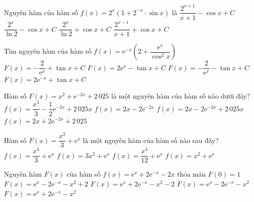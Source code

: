 \begin{ex}%
	 Nguyên hàm của hàm số $f(x)=2^x(1+2^{-x} \cdot \sin x)$ là
	\choice 
		{$\dfrac{2^{x+1}}{x+1}-\cos x+C$} 
		{\True $\dfrac{2^x}{\ln 2}-\cos x+C$} 
		 {$\dfrac{2^x}{\ln 2}+\cos x+C$}
		{$\dfrac{2^{x-1}}{x+1}+\cos  x+C$}
\end{ex}

\begin{ex}%
	Tìm nguyên hàm  của hàm số $f(x)=\mathrm{e}^{-x}\left(2+\dfrac{\mathrm{e}^x}{\cos^2 x}\right)$
	 \choice
		{\True $F(x)=-\dfrac{2}{\mathrm{e}^x}+\tan x+C$} 
		{$F(x)=2\mathrm{e}^x-\tan x+C$} 
		{$F(x)=-\dfrac{2}{\mathrm{e}^x}-\tan x+C$} 
		 {$F(x)=2\mathrm{e}^{-x}+\tan x+C$}
\end{ex}

\begin{ex}%
	Hàm số $F(x)=x^2+\mathrm{e}^{-2x}+2\,025$ là một nguyên hàm của hàm số nào  dưới đây?
	\choice 
		{$f(x)=\dfrac{x^3}{3}-\dfrac{1}{2}\mathrm{e}^{-2x}+2\,025x$} 
		{\True $f(x)=2x-2\mathrm{e}^{-2x}$} 
		 {$f(x)=2x-2\mathrm{e}^{-2x}+2\,025x$}
		{$f(x)=2x+2\mathrm{e}^{-2x}+2\,025$} 
\end{ex}

\begin{ex}%
	 Hàm số $F(x)=\dfrac{x^3}{3}+\mathrm{e}^x$ là một nguyên hàm của hàm số nào sau đây?
	\choice 
		{$f(x)=\dfrac{x^4}{3}+\mathrm{e}^x$} 
		{$f(x)=3x^2+\mathrm{e}^x$} 
		 {$f(x)=\dfrac{x^4}{12}+\mathrm{e}^x$}
		{\True  $f(x)=x^2+\mathrm{e}^x$}
\end{ex}

\begin{ex}%
	Nguyên hàm $F(x)$ của  hàm số $f(x)=\mathrm{e}^x+2\mathrm{e}^{-x}-2x$ thỏa mãn $F(0)=1$
	\choice 
		 {\True $F(x)=\mathrm{e}^x-2\mathrm{e}^{-x}-x^2+2$}
		{$F(x)=\mathrm{e}^x+2\mathrm{e}^{-x}-x^2-2$} 
		{$F(x)=\mathrm{e}^x-2\mathrm{e}^{-x}-x^2$} 
		 {$F(x)=\mathrm{e}^x+2\mathrm{e}^{-x}-x^2$}
\end{ex}

